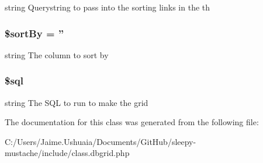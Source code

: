 string Querystring to pass into the sorting links in the th \hypertarget{class_db_grid_ae4a5f363089eeaaa9f463a99c6503bcb}{
\subsubsection[{\$sort\-By}]{\setlength{\rightskip}{0pt plus 5cm}\$sort\-By = ''\hspace{0.3cm}{\ttfamily [protected]}}}\label{class_db_grid_ae4a5f363089eeaaa9f463a99c6503bcb}
string The column to sort by \hypertarget{class_db_grid_a047170d6020a882807665812a27e2525}{
\subsubsection[{\$sql}]{\setlength{\rightskip}{0pt plus 5cm}\$sql\hspace{0.3cm}{\ttfamily [protected]}}}\label{class_db_grid_a047170d6020a882807665812a27e2525}
string The S\-Q\-L to run to make the grid 

The documentation for this class was generated from the following file\-:\begin{DoxyCompactItemize}
\item 
C\-:/\-Users/\-Jaime.\-Ushuaia/\-Documents/\-Git\-Hub/sleepy-\/mustache/include/class.\-dbgrid.\-php\end{DoxyCompactItemize}
